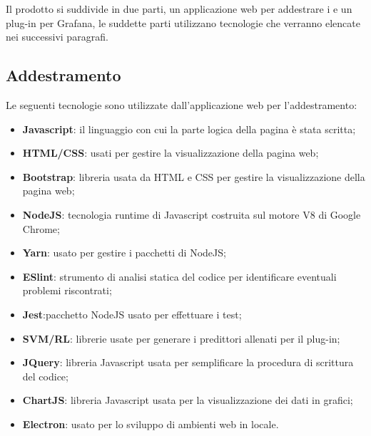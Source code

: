 \documentclass[../manuale-sviluppatore.tex]{subfiles}
\begin{document}
Il prodotto si suddivide in due parti, un applicazione web per addestrare i  e un plug-in per Grafana, le suddette parti utilizzano tecnologie che verranno elencate nei successivi paragrafi.

\subsection{Addestramento}%
\label{subs:addestramento}
Le seguenti tecnologie sono utilizzate dall'applicazione web per l'addestramento:
\begin{itemize}
  \item \textbf{Javascript}: il linguaggio con cui la parte logica della pagina è stata scritta;
  \item \textbf{HTML/CSS}: usati per gestire la visualizzazione della pagina web;
  \item \textbf{Bootstrap}: libreria usata da HTML e CSS per gestire la visualizzazione della pagina web;
  \item \textbf{NodeJS}: tecnologia runtime di Javascript costruita sul motore V8 di Google Chrome;
  \item \textbf{Yarn}: usato per gestire i pacchetti di NodeJS;
  \item \textbf{ESlint}: strumento di analisi statica del codice per identificare eventuali problemi riscontrati;
  \item \textbf{Jest}:pacchetto NodeJS usato per effettuare i test;
  \item \textbf{SVM/RL}: librerie usate per generare i predittori allenati per il plug-in;
  \item \textbf{JQuery}: libreria Javascript usata per semplificare la procedura di scrittura del codice;
  \item \textbf{ChartJS}: libreria Javascript usata per la visualizzazione dei dati in grafici;
  \item \textbf{Electron}: usato per lo sviluppo di ambienti web in locale.
\end{itemize}
\end{document}
